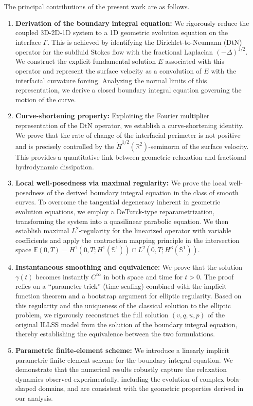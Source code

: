 \documentclass{article}
\theoremstyle{remark}
\theoremstyle{definition}
\numberwithin{equation}{section}
\begin{document}
The principal contributions of the present work are as follows.
\begin{enumerate}
    \item \textbf{Derivation of the boundary integral equation:}
    We rigorously reduce the coupled 3D-2D-1D system to a 1D geometric evolution equation on the interface $\Gamma$. This is achieved by identifying the Dirichlet-to-Neumann (DtN) operator for the subfluid Stokes flow with the fractional Laplacian $(-\Delta)^{1/2}$. We construct the explicit fundamental solution $E$ associated with this operator and represent the surface velocity as a convolution of $E$ with the interfacial curvature forcing. Analyzing the normal limits of this representation, we derive a closed boundary integral equation governing the motion of the curve.

    \item \textbf{Curve-shortening property:}
    Exploiting the Fourier multiplier representation of the DtN operator, we establish a curve-shortening identity. We prove that the rate of change of the interfacial perimeter is not positive and is precisely controlled by the $\dot H^{1/2}(\mathbb{R}^2)$-seminorm of the surface velocity. This provides a quantitative link between geometric relaxation and fractional hydrodynamic dissipation.

    \item \textbf{Local well-posedness via maximal regularity:}
    We prove the local well-posedness of the derived boundary integral equation in the class of smooth curves. To overcome the tangential degeneracy inherent in geometric evolution equations, we employ a DeTurck-type reparametrization, transforming the system into a quasilinear parabolic equation. We then establish maximal $L^2$-regularity for the linearized operator with variable coefficients and apply the contraction mapping principle in the intersection space $\mathbb{E}(0,T) = H^1(0,T;H^1(\mathbb{S}^1)) \cap L^2(0,T;H^3(\mathbb{S}^1))$.

    \item \textbf{Instantaneous smoothing and equivalence:}
    We prove that the solution $\gamma(t)$ becomes instantly $C^\infty$ in both space and time for $t > 0$. The proof relies on a ``parameter trick'' (time scaling) combined with the implicit function theorem and a bootstrap argument for elliptic regularity. Based on this regularity and the uniqueness of the classical solution to the elliptic problem, we rigorously reconstruct the full solution $(v, q, u, p)$ of the original ILLSS model from the solution of the boundary integral equation, thereby establishing the equivalence between the two formulations.

    \item \textbf{Parametric finite-element scheme:}
    We introduce a linearly implicit parametric finite-element scheme for the boundary integral equation. We demonstrate that the numerical results robustly capture the relaxation dynamics observed experimentally, including the evolution of complex bola-shaped domains, and are consistent with the geometric properties derived in our analysis.
\end{enumerate}
\end{document}
